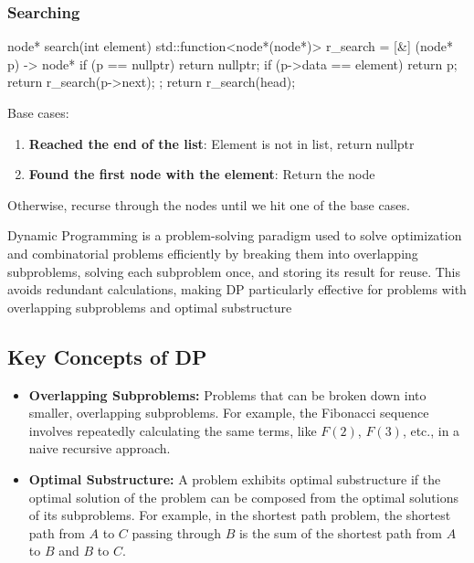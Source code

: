 \documentclass{report}
\begin{document}
\pagebreak 
\subsubsection{Searching}
\bigbreak \noindent 
\begin{cppcode}
    node* search(int element) {
        std::function<node*(node*)> r_search = [&] (node* p) -> node* {
            if (p == nullptr)  {
                return nullptr;
            }
            if (p->data == element) {
                return p;
            }
            return r_search(p->next);
        };
        return r_search(head);
    }
\end{cppcode}
\bigbreak \noindent 
Base cases:
\begin{enumerate}
    \item \textbf{Reached the end of the list}: Element is not in list, return nullptr
    \item \textbf{Found the first node with the element}: Return the node
\end{enumerate}
\bigbreak \noindent 
Otherwise, recurse through the nodes until we hit one of the base cases.

\pagebreak 
{}
\bigbreak \noindent 
Dynamic Programming is a problem-solving paradigm used to solve optimization and combinatorial problems efficiently by breaking them into overlapping subproblems, solving each subproblem once, and storing its result for reuse. This avoids redundant calculations, making DP particularly effective for problems with overlapping subproblems and optimal substructure
\subsection{Key Concepts of DP}
\bigbreak \noindent 
\begin{itemize}
    \item \textbf{Overlapping Subproblems:} Problems that can be broken down into smaller, overlapping subproblems. For example, the Fibonacci sequence involves repeatedly calculating the same terms, like $F(2)$, $F(3)$, etc., in a naive recursive approach.
    \item \textbf{Optimal Substructure:} A problem exhibits optimal substructure if the optimal solution of the problem can be composed from the optimal solutions of its subproblems. For example, in the shortest path problem, the shortest path from $A$ to $C$ passing through $B$ is the sum of the shortest path from $A$ to $B$ and $B$ to $C$.
\end{itemize}
\bigbreak \noindent 
\end{document}
